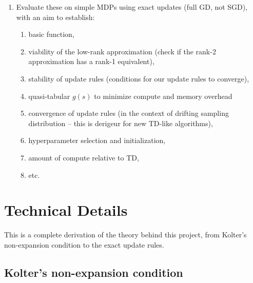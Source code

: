 \documentclass[11pt]{article}
\begin{document}
\begin{enumerate}
  \item Evaluate these on simple MDPs using exact updates (full GD, not SGD), with an aim to establish:
  \begin{enumerate}
    \item basic function,
    \item viability of the low-rank approximation (check if the rank-2 approximation has a rank-1 equivalent),
    \item stability of update rules (conditions for our update rules to converge),
    \item quasi-tabular $g(s)$ to minimize compute and memory overhead
    \item convergence of update rules (in the context of drifting sampling distribution -- this is derigeur for new TD-like algorithms), 
    \item hyperparameter selection and initialization,
    \item amount of compute relative to TD,
    \item etc.
  \end{enumerate}
\end{enumerate}

\clearpage

\printbibliography

\clearpage

\appendix

\section{Technical Details}

This is a complete derivation of the theory behind this project, from Kolter's non-expansion condition \cite{kolter2011fixed} to the exact update rules.

\subsection{Kolter's non-expansion condition}
\end{document}
